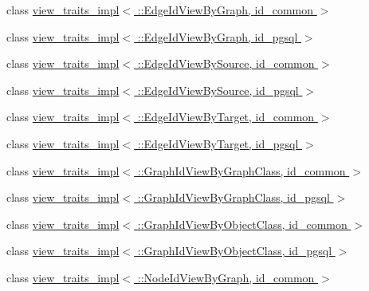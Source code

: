 \begin{DoxyCompactItemize}
\item 
class \hyperlink{classodb_1_1access_1_1view__traits__impl_3_01_1_1_edge_id_view_by_graph_00_01id__common_01_4}{view\+\_\+traits\+\_\+impl$<$ \+::\+Edge\+Id\+View\+By\+Graph, id\+\_\+common $>$}
\item 
class \hyperlink{classodb_1_1access_1_1view__traits__impl_3_01_1_1_edge_id_view_by_graph_00_01id__pgsql_01_4}{view\+\_\+traits\+\_\+impl$<$ \+::\+Edge\+Id\+View\+By\+Graph, id\+\_\+pgsql $>$}
\item 
class \hyperlink{classodb_1_1access_1_1view__traits__impl_3_01_1_1_edge_id_view_by_source_00_01id__common_01_4}{view\+\_\+traits\+\_\+impl$<$ \+::\+Edge\+Id\+View\+By\+Source, id\+\_\+common $>$}
\item 
class \hyperlink{classodb_1_1access_1_1view__traits__impl_3_01_1_1_edge_id_view_by_source_00_01id__pgsql_01_4}{view\+\_\+traits\+\_\+impl$<$ \+::\+Edge\+Id\+View\+By\+Source, id\+\_\+pgsql $>$}
\item 
class \hyperlink{classodb_1_1access_1_1view__traits__impl_3_01_1_1_edge_id_view_by_target_00_01id__common_01_4}{view\+\_\+traits\+\_\+impl$<$ \+::\+Edge\+Id\+View\+By\+Target, id\+\_\+common $>$}
\item 
class \hyperlink{classodb_1_1access_1_1view__traits__impl_3_01_1_1_edge_id_view_by_target_00_01id__pgsql_01_4}{view\+\_\+traits\+\_\+impl$<$ \+::\+Edge\+Id\+View\+By\+Target, id\+\_\+pgsql $>$}
\item 
class \hyperlink{classodb_1_1access_1_1view__traits__impl_3_01_1_1_graph_id_view_by_graph_class_00_01id__common_01_4}{view\+\_\+traits\+\_\+impl$<$ \+::\+Graph\+Id\+View\+By\+Graph\+Class, id\+\_\+common $>$}
\item 
class \hyperlink{classodb_1_1access_1_1view__traits__impl_3_01_1_1_graph_id_view_by_graph_class_00_01id__pgsql_01_4}{view\+\_\+traits\+\_\+impl$<$ \+::\+Graph\+Id\+View\+By\+Graph\+Class, id\+\_\+pgsql $>$}
\item 
class \hyperlink{classodb_1_1access_1_1view__traits__impl_3_01_1_1_graph_id_view_by_object_class_00_01id__common_01_4}{view\+\_\+traits\+\_\+impl$<$ \+::\+Graph\+Id\+View\+By\+Object\+Class, id\+\_\+common $>$}
\item 
class \hyperlink{classodb_1_1access_1_1view__traits__impl_3_01_1_1_graph_id_view_by_object_class_00_01id__pgsql_01_4}{view\+\_\+traits\+\_\+impl$<$ \+::\+Graph\+Id\+View\+By\+Object\+Class, id\+\_\+pgsql $>$}
\item 
class \hyperlink{classodb_1_1access_1_1view__traits__impl_3_01_1_1_node_id_view_by_graph_00_01id__common_01_4}{view\+\_\+traits\+\_\+impl$<$ \+::\+Node\+Id\+View\+By\+Graph, id\+\_\+common $>$}

\end{DoxyCompactItemize}

